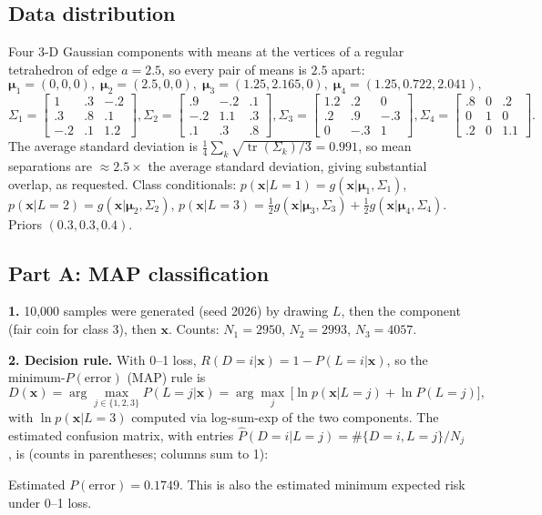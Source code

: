 \documentclass[10pt]{article}
\newcommand{\x}{\mathbf{x}}
\newcommand{\tr}{\operatorname{tr}}
\begin{document}
\subsection*{Data distribution}
Four 3-D Gaussian components with means at the vertices of a regular tetrahedron of edge $a=2.5$, so every pair of means is $2.5$ apart:
\[
\bm\mu_1=(0,0,0),\;\bm\mu_2=(2.5,0,0),\;\bm\mu_3=(1.25,2.165,0),\;\bm\mu_4=(1.25,0.722,2.041),
\]
\[
\Sigma_1=\begin{bmatrix}1&.3&-.2\\.3&.8&.1\\-.2&.1&1.2\end{bmatrix},
\Sigma_2=\begin{bmatrix}.9&-.2&.1\\-.2&1.1&.3\\.1&.3&.8\end{bmatrix},
\Sigma_3=\begin{bmatrix}1.2&.2&0\\.2&.9&-.3\\0&-.3&1\end{bmatrix},
\Sigma_4=\begin{bmatrix}.8&0&.2\\0&1&0\\.2&0&1.1\end{bmatrix}.
\]
The average standard deviation is $\frac14\sum_k\sqrt{\tr(\Sigma_k)/3}=0.991$, so mean separations are $\approx2.5\times$ the average standard deviation, giving substantial overlap, as requested.
Class conditionals: $p(\x|L{=}1)=g(\x|\bm\mu_1,\Sigma_1)$, $p(\x|L{=}2)=g(\x|\bm\mu_2,\Sigma_2)$, $p(\x|L{=}3)=\tfrac12 g(\x|\bm\mu_3,\Sigma_3)+\tfrac12 g(\x|\bm\mu_4,\Sigma_4)$. Priors $(0.3,0.3,0.4)$.

\subsection*{Part A: MAP classification}
\textbf{1.} 10{,}000 samples were generated (seed 2026) by drawing $L$, then the component (fair coin for class 3), then $\x$. Counts: $N_1=2950$, $N_2=2993$, $N_3=4057$.

\textbf{2. Decision rule.} With 0--1 loss, $R(D{=}i|\x)=1-P(L{=}i|\x)$, so the minimum-$P(\text{error})$ (MAP) rule is
\[
D(\x)=\arg\max_{j\in\{1,2,3\}} P(L{=}j|\x)=\arg\max_{j}\,\big[\ln p(\x|L{=}j)+\ln P(L{=}j)\big],
\]
with $\ln p(\x|L{=}3)$ computed via log-sum-exp of the two components. The estimated confusion matrix, with entries $\hat P(D{=}i|L{=}j)=\#\{D{=}i,L{=}j\}/N_j$, is (counts in parentheses; columns sum to 1):
\begin{center}\small\end{center}
Estimated $P(\text{error})=\mathbf{0.1749}$. This is also the estimated minimum expected risk under 0--1 loss.
\end{document}
